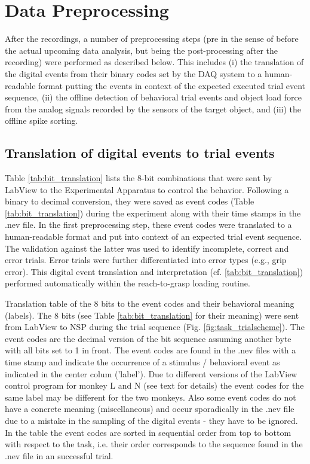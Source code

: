 {\section{Data Preprocessing}
\label{sec:data_preprocessing}

After the recordings, a number of preprocessing steps (pre in the sense of before the actual upcoming data analysis, but being the post-processing after the recording) were performed as described below. This includes (i) the translation of the digital events from their binary codes set by the DAQ system to a human-readable format putting the events in context of the expected executed trial event sequence, (ii) the offline detection of behavioral trial events and object load force from the analog signals recorded by the sensors of the target object, and (iii) the offline spike sorting.

\subsection{Translation of digital events to trial events }

Table \cref{tab:bit_translation} lists the 8-bit combinations that were sent by LabView to the Experimental Apparatus to control the behavior. Following a binary to decimal conversion, they were saved as event codes (Table \cref{tab:bit_translation}) during the experiment along with their time stamps in the .nev file. In the first preprocessing step, these event codes were translated to a human-readable format and put into context of an expected trial event sequence. The validation against the latter was used to identify incomplete, correct and error trials. Error trials were further differentiated into error types (e.g., grip error). This digital event translation and interpretation (cf. \cref{tab:bit_translation}) performed automatically within the reach-to-grasp loading routine. 

Translation table of the 8 bits to the event codes and their behavioral meaning (labels). The 8 bits (see Table \cref{tab:bit_translation} for their meaning) were sent from LabView to NSP during the trial sequence (Fig. \cref{fig:task_trialscheme}). The event codes are the decimal version of the bit sequence assuming another byte with all bits set to 1 in front. The event codes are found in the .nev files with a time stamp and indicate the occurrence of a stimulus / behavioral event as indicated in the center colum ('label'). Due to different versions of the LabView control program for monkey L and N (see text for details) the event codes for the same label may be different for the two monkeys. Also some event codes do not have a concrete meaning (miscellaneous) and occur sporadically in the .nev file due to a mistake in the sampling of the digital events - they have to be ignored. In the table the event codes are sorted in sequential order from top to bottom with respect to the task, i.e. their order corresponds to the sequence found in the .nev file in an successful trial. 

}
